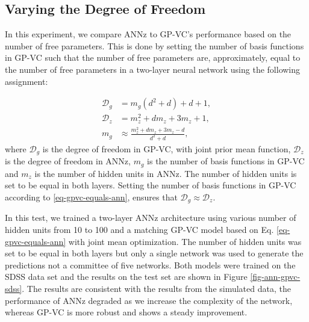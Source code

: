 \documentclass[useAMS,usenatbib,fleqn]{mn2e}
\begin{document}
\subsection{Varying the Degree of Freedom}

In this experiment, we compare {\sc ANNz} to GP-VC's performance based on the number of free parameters. This is done by setting the number of basis functions in GP-VC such that the number of free parameters are, approximately, equal to the number of free parameters in a two-layer neural network using the following assignment:

\begin{subequations}
\begin{align}
\label{eq-gpvc-degree}
\mathcal{D}_{g}		&=		m_{g}\left(d^{2}+d\right)+d+1,\\
\label{eq-ann-degree}
\mathcal{D}_{z}	&=		m_{z}^{2}+dm_{z}+3m_{z}+1,\\
\label{eq-gpvc-equals-ann}
m_{g}		&\approx 	\frac{m_{z}^{2}+dm_{z}+3m_{z}-d}{d^{2}+d},
\end{align}
\end{subequations}
where $\mathcal{D}_{g}$ is the degree of freedom in GP-VC, with joint prior mean function, $\mathcal{D}_{z}$ is the degree of freedom in {\sc ANNz}, $m_{g}$ is the number of basis functions in GP-VC and $m_{z}$ is the number of hidden units in {\sc ANNz}. The number of hidden units is set to be equal in both layers. Setting the number of basis functions in GP-VC according to \eqref{eq-gpvc-equals-ann}, ensures that $\mathcal{D}_{g} \approx \mathcal{D}_{z}$.

In this test, we trained a two-layer {\sc ANNz} architecture using various number of hidden units from 10 to 100 and a matching GP-VC model based on Eq. \eqref{eq-gpvc-equals-ann} with joint mean optimization. The number of hidden units was set to be equal in both layers but only a single network was used to generate the predictions not a committee of five networks. Both models were trained on the SDSS data set and the results on the test set are shown in Figure \ref{fig-ann-gpvc-sdss}. The results are consistent with the results from the simulated data, the performance of {\sc ANNz} degraded as we increase the complexity of the network, whereas GP-VC is more robust and shows a steady improvement.
\end{document}
